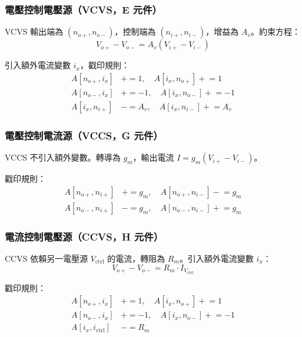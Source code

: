 \documentclass[12pt,a4paper]{article}
\begin{document}
\subsubsection{電壓控制電壓源（VCVS，E 元件）}

VCVS 輸出端為 $(n_{o+}, n_{o-})$，控制端為 $(n_{i+}, n_{i-})$，增益為 $A_v$。約束方程：
\begin{equation}
V_{o+} - V_{o-} = A_v(V_{i+} - V_{i-})
\end{equation}

引入額外電流變數 $i_x$，戳印規則：
\begin{equation}
\begin{aligned}
A[n_{o+}, i_x] &\mathrel{+}= 1, \quad A[i_x, n_{o+}] \mathrel{+}= 1 \\
A[n_{o-}, i_x] &\mathrel{+}= -1, \quad A[i_x, n_{o-}] \mathrel{+}= -1 \\
A[i_x, n_{i+}] &\mathrel{-}= A_v, \quad A[i_x, n_{i-}] \mathrel{+}= A_v
\end{aligned}
\end{equation}

\subsubsection{電壓控制電流源（VCCS，G 元件）}

VCCS 不引入額外變數。轉導為 $g_m$，輸出電流 $I = g_m(V_{i+} - V_{i-})$。

戳印規則：
\begin{equation}
\begin{aligned}
A[n_{o+}, n_{i+}] &\mathrel{+}= g_m, \quad A[n_{o+}, n_{i-}] \mathrel{-}= g_m \\
A[n_{o-}, n_{i+}] &\mathrel{-}= g_m, \quad A[n_{o-}, n_{i-}] \mathrel{+}= g_m
\end{aligned}
\end{equation}

\subsubsection{電流控制電壓源（CCVS，H 元件）}

CCVS 依賴另一電壓源 $V_{\text{ctrl}}$ 的電流，轉阻為 $R_m$。引入額外電流變數 $i_x$：
\begin{equation}
V_{o+} - V_{o-} = R_m \cdot I_{V_{\text{ctrl}}}
\end{equation}

戳印規則：
\begin{equation}
\begin{aligned}
A[n_{o+}, i_x] &\mathrel{+}= 1, \quad A[i_x, n_{o+}] \mathrel{+}= 1 \\
A[n_{o-}, i_x] &\mathrel{+}= -1, \quad A[i_x, n_{o-}] \mathrel{+}= -1 \\
A[i_x, i_{\text{ctrl}}] &\mathrel{-}= R_m
\end{aligned}
\end{equation}
\end{document}
